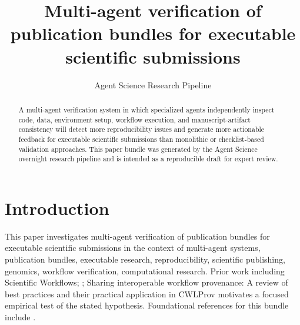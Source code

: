 \documentclass[11pt]{article}
\title{Multi-agent verification of publication bundles for executable scientific submissions}
\author{Agent Science Research Pipeline}
\date{}
\begin{document}
\maketitle
\begin{abstract}
A multi-agent verification system in which specialized agents independently inspect code, data, environment setup, workflow execution, and manuscript-artifact consistency will detect more reproducibility issues and generate more actionable feedback for executable scientific submissions than monolithic or checklist-based validation approaches. This paper bundle was generated by the Agent Science overnight research pipeline and is intended as a reproducible draft for expert review.
\end{abstract}
\section{Introduction}
This paper investigates multi-agent verification of publication bundles for executable scientific submissions in the context of multi-agent systems, publication bundles, executable research, reproducibility, scientific publishing, genomics, workflow verification, computational research. Prior work including Scientific Workflows; ; Sharing interoperable workflow provenance: A review of best practices and their practical application in CWLProv motivates a focused empirical test of the stated hypothesis. Foundational references for this bundle include \citep{cheesunliew20161,jeremyleipzig20242,farahzaibkhan20193}.
\end{document}
